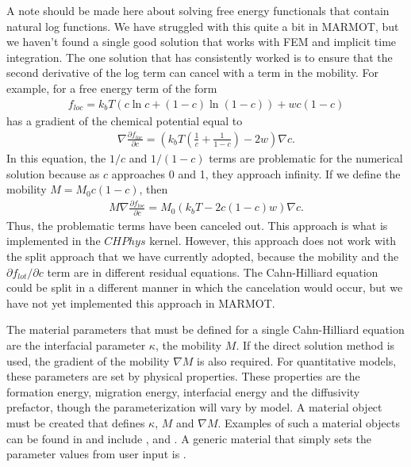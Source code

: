 \documentclass[letter,12pt,fleqn]{article}
\begin{document}
A note should be made here about solving free energy functionals that contain natural log functions. We have struggled with this quite a bit in MARMOT, but we haven't found a single good solution that works with FEM and implicit time integration. The one solution that has consistently worked is to ensure that the second derivative of the log term can cancel with a term in the mobility. For example, for a free energy term of the form
\begin{eqnarray}
	f_{loc} = k_b T(c\ln c + (1-c)\ln(1-c)) + w c (1-c)
\end{eqnarray}
has a gradient of the chemical potential equal to
\begin{eqnarray}
	\nabla \frac{\partial f_{loc}}{\partial c} = \left(k_b T \left( \frac{1}{c} + \frac{1}{1-c} \right) - 2 w \right) \nabla c.
\end{eqnarray}
In this equation, the $1/c$ and $1/(1-c)$ terms are problematic for the numerical solution because as $c$ approaches 0 and 1, they approach infinity. If we define the mobility $M = M_0 c(1-c)$, then
\begin{eqnarray}
	M \nabla \frac{\partial f_{loc}}{\partial c} = M_0 \left(k_b T - 2 c(1-c) w \right) \nabla c.
\end{eqnarray}
Thus, the problematic terms have been canceled out. This approach is what is implemented in the $CHPhys$ kernel. However, this approach does not work with the split approach that we have currently adopted, because the mobility and the $\partial f_{lot}/\partial c$ term are in different residual equations. The Cahn-Hilliard equation could be split in a different manner in which the cancelation would occur, but we have not yet implemented this approach in MARMOT.

The material parameters that must be defined for a single Cahn-Hilliard equation are the interfacial parameter $\kappa$, the mobility $M$. If the direct solution method is used, the gradient of the mobility $\nabla M$ is also required. For quantitative models, these parameters are set by physical properties. These properties are the formation energy, migration energy, interfacial energy and the diffusivity prefactor, though the parameterization will vary by model. A material object must be created that defines $\kappa$, $M$ and $\nabla M$. Examples of such a material objects can be found in  and include ,  and . A generic material that simply sets the parameter values from user input is .
\end{document}

